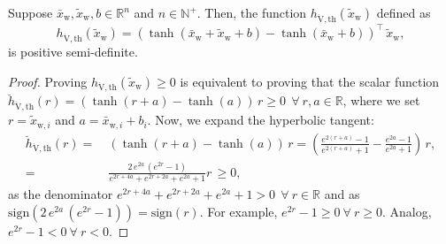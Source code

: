 \begin{lemma}\label{lemma:con:V_d_tanh_term_lower_bound}
    Suppose $\bar{x}_\mathrm{w}, \tilde{x}_\mathrm{w}, b \in \mathbb{R}^n$ and $n \in \mathbb{N}^+$. Then, the function $h_{\dot{\mathrm{V}},\mathrm{th}}(\tilde{x}_\mathrm{w})$ defined as
    \begin{equation}
        h_{\dot{\mathrm{V}},\mathrm{th}}(\tilde{x}_\mathrm{w}) = \left ( \tanh(\bar{x}_\mathrm{w} + \tilde{x}_\mathrm{w} + b) - \tanh(\bar{x}_\mathrm{w} + b) \right )^\top \, \tilde{x}_\mathrm{w},
    \end{equation}
    is positive semi-definite.
\end{lemma}
\begin{proof}
    Proving $h_{\dot{\mathrm{V}},\mathrm{th}}(\tilde{x}_\mathrm{w}) \geq 0$ is equivalent to proving that the scalar function $\breve{h}_{\dot{\mathrm{V}},\mathrm{th}}(r) = \left ( \tanh(r + a) - \tanh(a) \right ) \, r \geq 0 \: \: \forall \: r, a \in \mathbb{R}$, where we set $r = \tilde{x}_{\mathrm{w},i}$ and $a = \bar{x}_{\mathrm{w},i} + b_i$.
    Now, we expand the hyperbolic tangent:
    \begin{equation}
    \begin{split}
        \breve{h}_{\dot{\mathrm{V}},\mathrm{th}}(r) =& \: \left ( \tanh(r + a) - \tanh(a) \right ) \, r = \left ( \frac{e^{2(r+a)}-1}{e^{2(r+a)}+1} - \frac{e^{2a}-1}{e^{2a}+1} \right ) \, r,\\
        =& \: \frac{2 \, e^{2a} \, \left ( e^{2r} - 1 \right )}{e^{2r+4a}+e^{2r + 2a}+e^{2a}+1} r \, \geq 0,
    \end{split}
    \end{equation}
    as the denominator $e^{2r+4a}+e^{2r + 2a}+e^{2a}+1 > 0 \:\: \forall \: r \in \mathbb{R}$ and as $\mathrm{sign} \left (2 \, e^{2a} \, \left ( e^{2r} - 1 \right ) \right) = \mathrm{sign}(r)$. For example, $e^{2r} - 1 \geq 0 \: \forall \: r \geq 0$. Analog, $e^{2r} - 1 < 0 \: \forall \: r < 0$. 
\end{proof}

